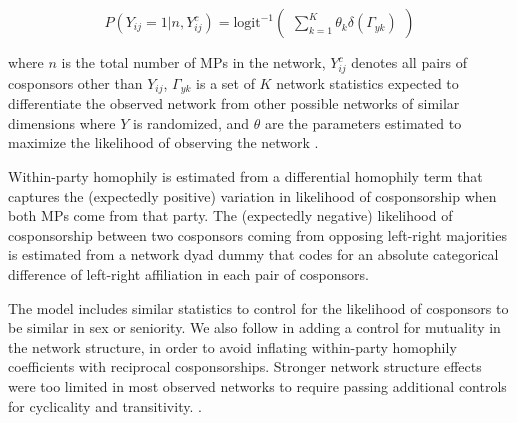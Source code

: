 \begin{description}
  \[
  P( Y_{ij} = 1 | n, Y_{ij}^{c} ) =
  \textrm{logit}^{-1}
  \begin{pmatrix}
    \displaystyle\sum_{k=1}^{K} \theta_{k} \delta ( \Gamma_{yk} )
  \end{pmatrix}
  \]

  where $n$ is the total number of MPs in the network, $Y_{ij}^{c}$ denotes all pairs of cosponsors other than $Y_{ij}$, $\Gamma_{yk}$ is a set of $K$ network statistics expected to differentiate the observed network from other possible networks of similar dimensions where $Y$ is randomized, and $\theta$ are the parameters estimated to maximize the likelihood of observing the network \citep[cited from][p.~71 and Equation~5]{CranmerDesmarais2011-PA}.%

  Within-party homophily is estimated from a differential homophily term \citep{KrivitskyHandcock2008-JSS} that captures the (expectedly positive) variation in likelihood of cosponsorship when both MPs come from that party. The (expectedly negative) likelihood of cosponsorship between two cosponsors coming from opposing left-right majorities is estimated from a network dyad dummy that codes for an absolute categorical difference of left-right affiliation in each pair of cosponsors.%

  The model includes similar statistics to control for the likelihood of cosponsors to be similar in sex or seniority. We also follow \citet{CranmerDesmarais2011-PA} in adding a control for mutuality in the network structure, in order to avoid inflating within-party homophily coefficients with reciprocal cosponsorships. Stronger network structure effects were too limited in most observed networks to require passing additional controls for cyclicality and transitivity.%
    .%


\end{description}

